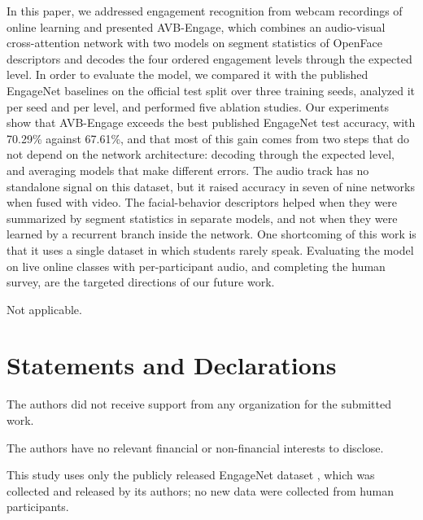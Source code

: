 \documentclass[pdflatex,iicol,sn-basic]{sn-jnl}
\newcommand{\ournet}{AVB-Engage}
\begin{document}
In this paper, we addressed engagement recognition from webcam recordings of online learning and presented \ournet, which combines an audio-visual cross-attention network with two models on segment statistics of OpenFace descriptors and decodes the four ordered engagement levels through the expected level. In order to evaluate the model, we compared it with the published EngageNet baselines on the official test split over three training seeds, analyzed it per seed and per level, and performed five ablation studies. Our experiments show that \ournet{} exceeds the best published EngageNet test accuracy, with 70.29\% against 67.61\%, and that most of this gain comes from two steps that do not depend on the network architecture: decoding through the expected level, and averaging models that make different errors. The audio track has no standalone signal on this dataset, but it raised accuracy in seven of nine networks when fused with video. The facial-behavior descriptors helped when they were summarized by segment statistics in separate models, and not when they were learned by a recurrent branch inside the network. One shortcoming of this work is that it uses a single dataset in which students rarely speak. Evaluating the model on live online classes with per-participant audio, and completing the human survey, are the targeted directions of our future work.

\backmatter


Not applicable.

\section*{Statements and Declarations}

The authors did not receive support from any organization for the submitted work.

The authors have no relevant financial or non-financial interests to disclose.

This study uses only the publicly released EngageNet dataset \citep{singh2023engagenet}, which was collected and released by its authors; no new data were collected from human participants. %
\end{document}
